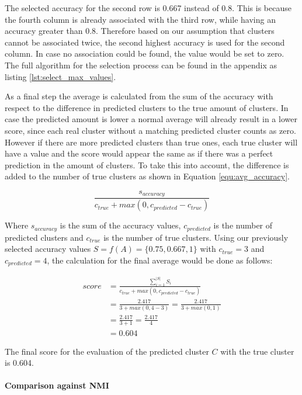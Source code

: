 The selected accuracy for the second row is 0.667 instead of 0.8. This is because the fourth column is already associated with the third row, while having an accuracy greater than 0.8. Therefore based on our assumption that clusters cannot be associated twice, the second highest accuracy is used for the second column. In case no association could be found, the value would be set to zero. The full algorithm for the selection process can be found in the appendix as listing \ref{lst:select_max_values}.

As a final step the average is calculated from the sum of the accuracy with respect to the difference in predicted clusters to the true amount of clusters. In case the predicted amount is lower a normal average will already result in a lower score, since each real cluster without a matching predicted cluster counts as zero. However if there are more predicted clusters than true ones, each true cluster will have a value and the score would appear the same as if there was a perfect prediction in the amount of clusters. To take this into account, the difference is added to the number of true clusters as shown in Equation \ref{equ:avg_accuracy}.

\begin{equation}
    \label{equ:avg_accuracy}
        \frac{s_{accuracy}}{c_{true} + max(0, c_{predicted} - c_{true})}
\end{equation}

Where $s_{accuracy}$ is the sum of the accuracy values, $c_{predicted}$ is the number of predicted clusters and $c_{true}$ is the number of true clusters. Using our previously selected accuracy values $S = f(A) = \{0.75, 0.667, 1\}$ with  $c_{true}=3$ and $c_{predicted}=4$, the calculation for the final average would be done as follows:

\begin{align*}
    score &= \frac{\sum_{i=1}^{|S|} S_i}{c_{true} + max(0, c_{predicted} - c_{true})} \\
    &= \frac{2.417}{3 + max(0, 4 - 3)} = \frac{2.417}{3 + max(0, 1)} \\
    &= \frac{2.417}{3 + 1} = \frac{2.417}{4} \\
    &= \mathbf{0.604}
\end{align*}

The final score for the evaluation of the predicted cluster $C$ with the true cluster is 0.604.

\paragraph{Comparison against NMI}

